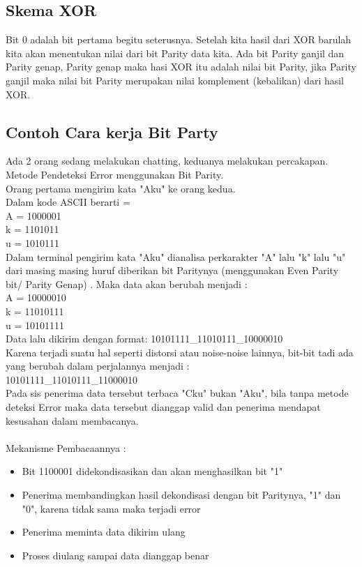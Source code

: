 
\subsection{Skema XOR}
Bit 0 adalah bit pertama begitu seterusnya. Setelah kita hasil dari XOR barulah kita akan menentukan nilai dari bit Parity data kita. Ada bit Parity ganjil dan Parity genap, Parity genap maka hasi XOR itu adalah nilai bit Parity, jika Parity ganjil maka nilai bit Parity merupakan nilai komplement (kebalikan) dari hasil XOR.

\subsection{Contoh Cara kerja Bit Party}
Ada 2 orang sedang melakukan chatting, keduanya melakukan percakapan. Metode Pendeteksi Error menggunakan Bit Parity.\\
Orang pertama mengirim kata "Aku" ke orang kedua.\\
Dalam kode ASCII berarti =\\
A = 1000001\\
k = 1101011\\
u = 1010111\\
Dalam terminal pengirim kata "Aku" dianalisa perkarakter "A" lalu "k" lalu "u"  dari masing masing huruf diberikan bit Paritynya (menggunakan Even Parity bit/ Parity Genap) . Maka data akan berubah menjadi :\\
A = 10000010\\
k = 11010111\\
u = 10101111\\
Data lalu dikirim dengan format: 10101111\_11010111\_10000010\\
Karena terjadi suatu hal seperti distorsi atau noise-noise lainnya, bit-bit tadi ada yang berubah dalam perjalannya menjadi :\\
10101111\_11010111\_11000010\\
Pada sis penerima data tersebut terbaca "Cku" bukan "Aku", bila tanpa metode deteksi Error maka data tersebut dianggap valid dan penerima mendapat kesusahan dalam membacanya.\\ \\
Mekanisme Pembacaannya :
\begin{itemize}
\item Bit 1100001 didekondisasikan dan akan menghasilkan bit "1"
\item Penerima membandingkan hasil dekondisasi dengan bit Paritynya, "1" dan "0", karena tidak sama maka terjadi error
\item Penerima meminta data dikirim ulang
\item Proses diulang sampai data dianggap benar
\end{itemize}

